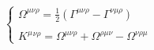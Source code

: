 \begin{equation}
\left\{ 
\begin{array}{c}
\Omega ^{\mu \nu \rho }=\frac{1}{2}\left( \Gamma ^{\mu \nu \rho }-\Gamma
^{\nu \mu \rho }\right) \\ 
\\ 
K^{\mu }{}^{\nu \rho }=\Omega ^{\mu \nu \rho }+\Omega ^{\rho \mu \nu
}-\Omega ^{\nu \rho \mu }
\end{array}
\right.
\end{equation}

